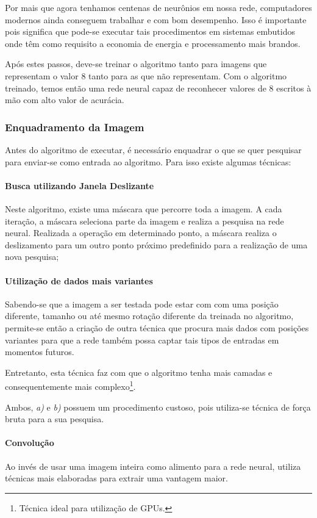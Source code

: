 \documentclass[10pt, conference]{IEEEtran}
\begin{document}
		Por mais que agora tenhamos centenas de neurônios em nossa rede, computadores modernos ainda conseguem trabalhar e com bom desempenho. Isso é importante pois significa que pode-se executar tais procedimentos em sistemas embutidos onde têm como requisito a economia de energia e processamento mais brandos.

		Após estes passos, deve-se treinar o algoritmo tanto para imagens que representam o valor 8 tanto para as que não representam. Com o algoritmo treinado, temos então uma rede neural capaz de reconhecer valores de 8 escritos à mão com alto valor de acurácia.


		\subsubsection{Enquadramento da Imagem}
			Antes do algoritmo de executar, é necessário enquadrar o que se quer pesquisar para enviar-se como entrada ao algoritmo. Para isso existe algumas técnicas:

			\paragraph{Busca utilizando Janela Deslizante}
				Neste algoritmo, existe uma máscara que percorre toda a imagem. A cada iteração, a máscara seleciona parte da imagem e realiza a pesquisa na rede neural. Realizada a operação em determinado ponto, a máscara realiza o deslizamento para um outro ponto próximo predefinido para a realização de uma nova pesquisa;


			\paragraph{Utilização de dados mais variantes}
				Sabendo-se que a imagem a ser testada pode estar com com uma posição diferente, tamanho ou até mesmo rotação diferente da treinada no algoritmo, permite-se então a criação de outra técnica que procura mais dados com posições variantes para que a rede também possa captar tais tipos de entradas em momentos futuros.

				Entretanto, esta técnica faz com que o algoritmo tenha mais camadas e consequentemente mais complexo\footnote{Técnica ideal para utilização de GPUs.}.

				Ambos, \textit{a)} e \textit{b)} possuem um procedimento custoso, pois utiliza-se técnica de força bruta para a sua pesquisa.


			\paragraph{Convolução}
				Ao invés de usar uma imagem inteira como alimento para a rede neural, utiliza técnicas mais elaboradas para extrair uma vantagem maior.
\end{document}
